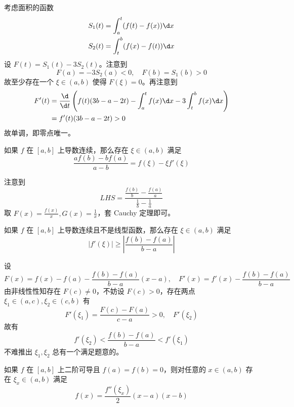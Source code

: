 \begin{solution}
	考虑面积的函数
	\[  \begin{aligned}
			S_1(t) & = \int_{a}^{t} (f(t) - f(x)) \d x \\
			S_2(t) & = \int_{t}^{b} (f(x) - f(t)) \d x
		\end{aligned} \]
	设 $F(t) = S_1(t) - 3S_2(t)$。注意到
	\[ F(a) = -3S_2(a) < 0, \quad F(b) = S_1(b) > 0 \]
	故至少存在一个 $\xi \in (a, b)$ 使得 $F(\xi) = 0$。再注意到
	\[ \begin{aligned}
			F'(t)
			 & = \frac{\d}{\d t}\left( f(t)(3b - a - 2t) - \int_{a}^{t} f(x) \d x - 3 \int_{t}^{b} f(x) \d x \right) \\
			 & = f'(t) (3b - a - 2t) > 0
		\end{aligned} \]
	故单调，即零点唯一。
\end{solution}

\begin{problem}[000033]
如果 $f$ 在 $[a, b]$ 上导数连续，那么存在 $\xi \in (a, b)$ 满足
\[ \frac{af(b) - bf(a)}{a - b} = f(\xi) - \xi f'(\xi) \]
\end{problem}

\begin{solution}
	注意到
	\[ LHS = \frac{\frac{f(b)}{b} - \frac{f(a)}{a}}{\frac{1}{b} - \frac{1}{a}} \]
	取 $F(x) = \frac{f(x)}{x}, G(x) = \frac{1}{x}$，套 Cauchy 定理即可。
\end{solution}

\begin{problem}[000034]
如果 $f$ 在 $[a, b]$ 上导数连续且不是线型函数，那么存在 $\xi \in (a, b)$ 满足
\[ |f'(\xi)| \geqslant \left| \frac{f(b) - f(a)}{b - a} \right| \]
\end{problem}

\begin{solution}
	设
	\[ F(x) = f(x) - f(a) - \frac{f(b) - f(a)}{b - a}(x - a), \quad F'(x) = f'(x) - \frac{f(b) - f(a)}{b - a} \]
	由非线性性知存在 $F(c) \neq 0$，不妨设 $F(c) > 0$，存在两点 $\xi_1 \in (a, c), \xi_2 \in (c, b)$ 有
	\[ F'(\xi_1) = \frac{F(c) - F(a)}{c - a} > 0, \quad F'(\xi_2)  \]
	故有
	\[ f'(\xi_2) < \frac{f(b) - f(a)}{b - a} < f'(\xi_1) \]
	不难推出 $\xi_1, \xi_2$ 总有一个满足题意的。
\end{solution}

\begin{problem}[000035]
如果 $f$ 在 $[a, b]$ 上二阶可导且 $f(a) = f(b) = 0$，则对任意的 $x \in (a, b)$ 存在 $\xi_x \in (a, b)$ 满足
\[ f(x) = \frac{f''(\xi_x)}{2}(x - a)(x - b) \]
\end{problem}

